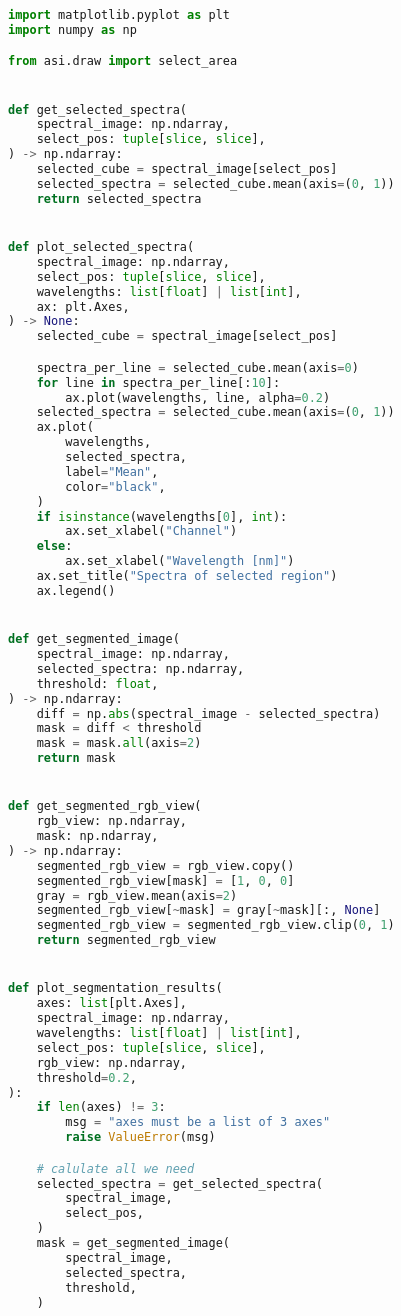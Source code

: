 \begin{lstlisting}[language=python, caption=\texttt{segmentation.py} , label={code:segmentation}]
import matplotlib.pyplot as plt
import numpy as np

from asi.draw import select_area


def get_selected_spectra(
    spectral_image: np.ndarray,
    select_pos: tuple[slice, slice],
) -> np.ndarray:
    selected_cube = spectral_image[select_pos]
    selected_spectra = selected_cube.mean(axis=(0, 1))
    return selected_spectra


def plot_selected_spectra(
    spectral_image: np.ndarray,
    select_pos: tuple[slice, slice],
    wavelengths: list[float] | list[int],
    ax: plt.Axes,
) -> None:
    selected_cube = spectral_image[select_pos]

    spectra_per_line = selected_cube.mean(axis=0)
    for line in spectra_per_line[:10]:
        ax.plot(wavelengths, line, alpha=0.2)
    selected_spectra = selected_cube.mean(axis=(0, 1))
    ax.plot(
        wavelengths,
        selected_spectra,
        label="Mean",
        color="black",
    )
    if isinstance(wavelengths[0], int):
        ax.set_xlabel("Channel")
    else:
        ax.set_xlabel("Wavelength [nm]")
    ax.set_title("Spectra of selected region")
    ax.legend()


def get_segmented_image(
    spectral_image: np.ndarray,
    selected_spectra: np.ndarray,
    threshold: float,
) -> np.ndarray:
    diff = np.abs(spectral_image - selected_spectra)
    mask = diff < threshold
    mask = mask.all(axis=2)
    return mask


def get_segmented_rgb_view(
    rgb_view: np.ndarray,
    mask: np.ndarray,
) -> np.ndarray:
    segmented_rgb_view = rgb_view.copy()
    segmented_rgb_view[mask] = [1, 0, 0]
    gray = rgb_view.mean(axis=2)
    segmented_rgb_view[~mask] = gray[~mask][:, None]
    segmented_rgb_view = segmented_rgb_view.clip(0, 1)
    return segmented_rgb_view


def plot_segmentation_results(
    axes: list[plt.Axes],
    spectral_image: np.ndarray,
    wavelengths: list[float] | list[int],
    select_pos: tuple[slice, slice],
    rgb_view: np.ndarray,
    threshold=0.2,
):
    if len(axes) != 3:
        msg = "axes must be a list of 3 axes"
        raise ValueError(msg)

    # calulate all we need
    selected_spectra = get_selected_spectra(
        spectral_image,
        select_pos,
    )
    mask = get_segmented_image(
        spectral_image,
        selected_spectra,
        threshold,
    )


\end{lstlisting}
